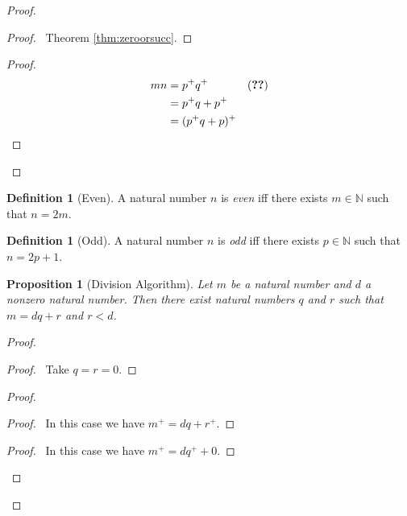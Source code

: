 \documentclass{book}
\let\qed\relax
\newtheorem{prop}[ax]{Proposition}
\theoremstyle{definition}
\newtheorem{df}[ax]{Definition}
\begin{document}
\begin{proof}
\pf
{}
\begin{proof}
	\pf\ Theorem \ref{thm:zeroorsucc}.
\end{proof}
\begin{proof}
	\pf
	\begin{align*}
		mn & = p^+ q^+ & (\text{\stepref{3}}) \\
		& = p^+q + p^+ \\
		& = (p^+ q + p)^+
	\end{align*}
\end{proof}
\qed
\end{proof}

\begin{df}[Even]
A natural number $n$ is \emph{even} iff there exists $m \in \mathbb{N}$ such that $n = 2m$.
\end{df}

\begin{df}[Odd]
A natural number $n$ is \emph{odd} iff there exists $p \in \mathbb{N}$ such that $n = 2p+1$.
\end{df}

\begin{prop}[Division Algorithm]
Let $m$ be a natural number and $d$ a nonzero natural number. Then there exist natural numbers $q$ and $r$ such that $m = dq + r$ and $r < d$.
\end{prop}

\begin{proof}
\pf
{}
\begin{proof}
	\pf\ Take $q = r = 0$.
\end{proof}
\begin{proof}
	\begin{proof}
		\pf\ In this case we have $m^+ = dq + r^+$.
	\end{proof}
	\begin{proof}
		\pf\ In this case we have $m^+ = dq^+ + 0$.
	\end{proof}
\end{proof}
\qed
\end{proof}
\end{document}
